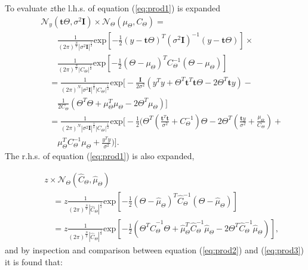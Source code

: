 To evaluate $z$\DIFaddbegin \DIFadd{, }\DIFaddend the l.h.s. of equation (\ref{eq:prod1}) is expanded
{\setlength\arraycolsep{2pt}
\begin{eqnarray}
\label{eq:prod2} & & \mathcal{N}_y(\textbf{t}\Theta,\sigma^2 \textbf{I})\times\mathcal{N}_\Theta(\mu_\Theta,C_\Theta) = \\\nonumber
& & \qquad \frac{1}{(2\pi)^{\frac{N}{2}} |\sigma^2\textbf{I}|^{\frac{1}{2}}} \textrm{exp}\left[-\frac{1}{2}(y - \textbf{t}\Theta)^T(\sigma^2 \textbf{I})^{-1}(y - \textbf{t}\Theta)\right] \times {} \\\nonumber
& & \qquad \frac{1}{(2\pi)^{\frac{N}{2}}|C_\Theta|^{\frac{1}{2}}} \textrm{exp}\left[-\frac{1}{2}(\Theta - \mu_\Theta)^TC_\Theta^{-1}(\Theta - \mu_\Theta)\right] \\\nonumber
& & \quad= \frac{1}{(2\pi)^N |\sigma^2\textbf{I}|^{\frac{1}{2}} |C_\Theta|^{\frac{1}{2}}} \textrm{exp}\bigg[-\frac{\textbf{I}}{2\sigma^2}\left(y^Ty+\Theta^T\textbf{t}^T\textbf{t}\Theta - 2 \Theta^T\textbf{t}y\right) - {} \\\nonumber
& & \qquad \frac{1}{2C_\Theta} \left(\Theta^T\Theta + \mu_\Theta^T\mu_\Theta - 2 \Theta^T\mu_\Theta\right) \bigg] \\\nonumber
& & \quad = \frac{1}{(2\pi)^N |\sigma^2\textbf{I}|^{\frac{1}{2}} |C_\Theta|^{\frac{1}{2}}} \textrm{exp}\Bigg[-\frac{1}{2}\Bigg(\Theta^T\left(\frac{\textbf{t}^T\textbf{t}}{\sigma^2} + C_\Theta^{-1}\right)\Theta - 2 \Theta^T\left(\frac{\textbf{t}y}{\sigma^2} + \frac{\mu_\Theta}{C_\Theta}\right) + {}\\\nonumber
& & \qquad \mu_\Theta^TC_\Theta^{-1}\mu_\Theta + \frac{y^Ty}{\sigma^2}\Bigg)\Bigg].
\end{eqnarray}}
The r.h.s. of equation (\ref{eq:prod1}) is also expanded,

{\setlength\arraycolsep{2pt}
\begin{eqnarray}
\label{eq:prod3} & & z \times \mathcal{N}_\Theta(\hat{C}_\Theta,\hat{\mu}_\Theta) \\\nonumber
& & \quad = z\frac{1}{(2\pi)^{\frac{N}{2}} |\hat{C}_\Theta|^{\frac{1}{2}}} \textrm{exp}\left[-\frac{1}{2}\left(\Theta - \hat{\mu}_\Theta\right)^T\hat{C}_\Theta^{-1}\left(\Theta - \hat{\mu}_\Theta\right)\right] \\\nonumber
& & \quad = z\frac{1}{(2\pi)^{\frac{N}{2}} |\hat{C}_\Theta|^{\frac{1}{2}}} \textrm{exp}\left[-\frac{1}{2}\left(\Theta^T\hat{C}_\Theta^{-1}\Theta + \hat{\mu}_\Theta^T\hat{C}_\Theta^{-1}\hat{\mu}_\Theta - 2\Theta^T\hat{C}_\Theta^{-1}\hat{\mu}_\Theta\right)\right],
\end{eqnarray}}
and by inspection and comparison between equation (\ref{eq:prod2}) and (\ref{eq:prod3}) it is found that:

